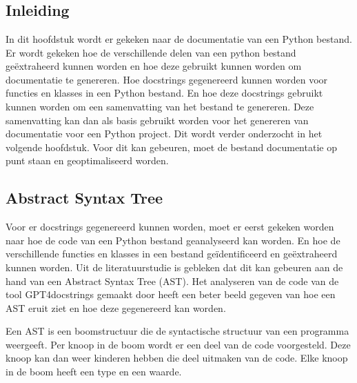 
\chapter{}%
\label{ch:bestanddocumentatie}

\section{Inleiding}
\label{sec:bestanddocumentatie-inleiding}
In dit hoofdstuk wordt er gekeken naar de documentatie van een Python bestand.
Er wordt gekeken hoe de verschillende delen van een python bestand geëxtraheerd kunnen worden en hoe deze gebruikt kunnen worden om documentatie te genereren.
Hoe docstrings gegenereerd kunnen worden voor functies en klasses in een Python bestand.
En hoe deze docstrings gebruikt kunnen worden om een samenvatting van het bestand te genereren.
Deze samenvatting kan dan als basis gebruikt worden voor het genereren van documentatie voor een Python project.
Dit wordt verder onderzocht in het volgende hoofdstuk.
Voor dit kan gebeuren, moet de bestand documentatie op punt staan en geoptimaliseerd worden.

\section{Abstract Syntax Tree}
\label{sec:bestanddocumentatie-ast}
Voor er docstrings gegenereerd kunnen worden, moet er eerst gekeken worden naar hoe de code van een Python bestand geanalyseerd kan worden.
En hoe de verschillende functies en klasses in een bestand geïdentificeerd en geëxtraheerd kunnen worden.
Uit de literatuurstudie is gebleken dat dit kan gebeuren aan de hand van een Abstract Syntax Tree (AST).
Het analyseren van de code van de tool GPT4docstrings gemaakt door \textcite{Trofficus2023} heeft een beter beeld gegeven van hoe een AST eruit ziet en hoe deze gegenereerd kan worden.

Een AST is een boomstructuur die de syntactische structuur van een programma weergeeft.
Per knoop in de boom wordt er een deel van de code voorgesteld. 
Deze knoop kan dan weer kinderen hebben die deel uitmaken van de code.
Elke knoop in de boom heeft een type en een waarde.

